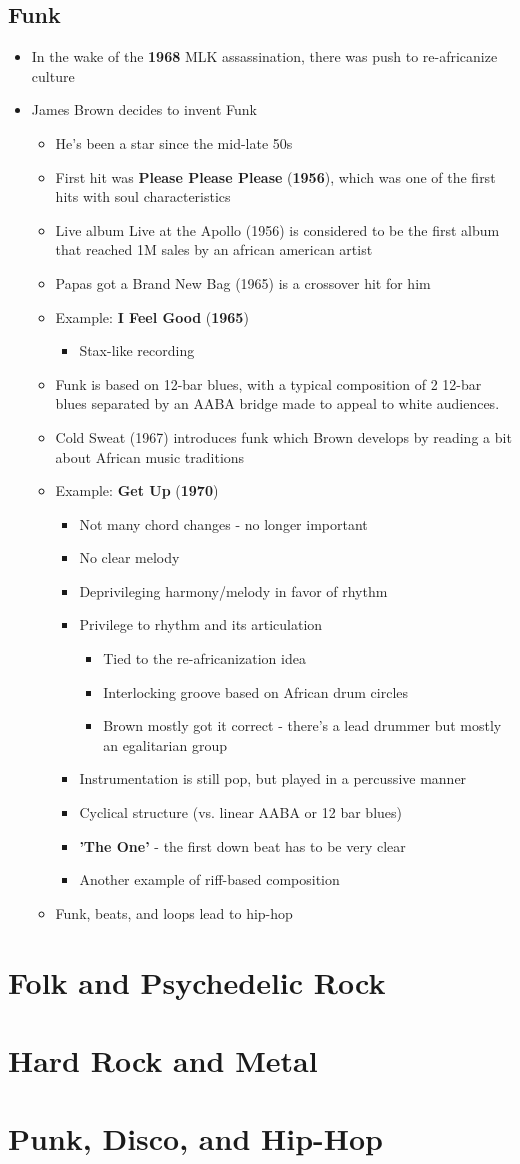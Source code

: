 \documentclass[11pt]{report}
\newcommand{\imp}[1]{\textbf{#1}}
\newcommand{\idate}[2]{\textcolor{blue!50}{\imp{#1}}\label{date:#2}}
\newcommand{\bl}{\begin{itemize}}
\newcommand{\kl}{\end{itemize}}
\newcommand{\song}[2]{\textcolor{red!70}{\textbf{#1}} (\idate{#2}{#1})}
\begin{document}
\section{Funk}
\begin{itemize}
	\item In the wake of the \idate{1968}{mlk-assassination} MLK assassination, there was push to re-africanize culture
	\item James Brown decides to invent Funk
	\bl
		\item He's been a star since the mid-late 50s
		\item First hit was \song{Please Please Please}{1956}, which was one of the first hits with soul characteristics
		\item Live album Live at the Apollo (1956) is considered to be the first album that reached 1M sales by an african american artist
		\item Papas got a Brand New Bag (1965) is a crossover hit for him
		\item Example: \song{I Feel Good}{1965}
		\bl
			\item Stax-like recording
		\kl
		\item Funk is based on 12-bar blues, with a typical composition of 2 12-bar blues separated by an AABA bridge made to appeal to white audiences.
		\item Cold Sweat (1967) introduces funk which Brown develops by reading a bit about African music traditions
		\item Example: \song{Get Up}{1970}
		\bl
			\item Not many chord changes - no longer important
			\item No clear melody
			\item Deprivileging harmony/melody in favor of rhythm
			\item Privilege to rhythm and its articulation
			\bl
				\item Tied to the re-africanization idea
				\item Interlocking groove based on African drum circles
				\item Brown mostly got it correct - there's a lead drummer but mostly an egalitarian group
			\kl
			\item Instrumentation is still pop, but played in a percussive manner
			\item Cyclical structure (vs. linear AABA or 12 bar blues)
			\item \textbf{'The One'} - the first down beat has to be very clear
			\item Another example of riff-based composition
		\kl
		\item Funk, beats, and loops lead to hip-hop
	\kl
\end{itemize}

\chapter{Folk and Psychedelic Rock}
\chapter{Hard Rock and Metal}
\chapter{Punk, Disco, and Hip-Hop}
\end{document}
